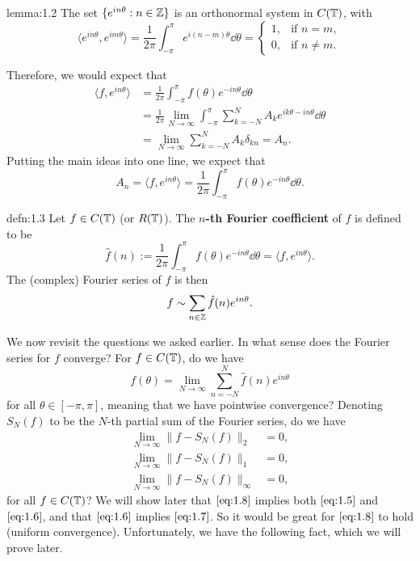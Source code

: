 \begin{lemma}{lemma:1.2}
    The set $\{e^{in\theta} : n \in \mathbb{Z}\}$ is an orthonormal system in 
    $C(\mathbb{T})$, with 
    \[ \langle e^{in\theta}, e^{im\theta} \rangle = \frac{1}{2\pi} 
    \int_{-\pi}^\pi e^{i(n-m)\theta}\dd\theta = \begin{cases} 
        1, & \text{if } n=m, \\ 
        0, & \text{if } n\neq m.
    \end{cases} \] 
\end{lemma}

Therefore, we would expect that 
\begin{align*}
    \langle f, e^{in\theta} \rangle 
    &= \frac{1}{2\pi} \int_{-\pi}^\pi f(\theta)e^{-in\theta}\dd\theta \\ 
    &= \frac{1}{2\pi} \lim_{N\to\infty} \int_{-\pi}^\pi \sum_{k=-N}^N
    A_k e^{ik\theta - in\theta}\dd\theta \\ 
    &= \lim_{N\to\infty} \sum_{k=-N}^N A_k \delta_{kn} = A_n. 
\end{align*}
Putting the main ideas into one line, we expect that 
\[ A_n = \langle f, e^{in\theta} \rangle = \frac{1}{2\pi} \int_{-\pi}^\pi 
f(\theta)e^{-in\theta}\dd\theta. \] 

\begin{defn}{defn:1.3}
    Let $f \in C(\mathbb{T})$ (or $R(\mathbb{T})$). The {\bf $n$-th Fourier coefficient} of 
    $f$ is defined to be 
    \[ \hat f(n) := \frac{1}{2\pi} \int_{-\pi}^\pi f(\theta)e^{-in\theta}\dd\theta = 
    \langle f, e^{in\theta} \rangle. \] 
    The (complex) Fourier series of $f$ is then 
    \[ f \sim \sum_{n\in\mathbb{Z}} \hat f(n)e^{in\theta}. \] 
\end{defn}

We now revisit the questions we asked earlier. In what sense does the 
Fourier series for $f$ converge? For $f \in C(\mathbb{T})$, do we have 
\begin{equation}\label{eq:1.5}
    f(\theta) = \lim_{N\to\infty} \sum_{n=-N}^N \hat f(n)e^{in\theta} \tag{A}
\end{equation}
for all $\theta \in [-\pi, \pi]$, meaning that we have pointwise convergence? 
Denoting $S_N(f)$ to be the $N$-th partial sum of the Fourier series, do we have 
\begin{align}
    \lim_{N\to\infty} \|f - S_N(f)\|_2 &= 0, \label{eq:1.6} \tag{B} \\ 
    \lim_{N\to\infty} \|f - S_N(f)\|_1 &= 0, \label{eq:1.7} \tag{C} \\ 
    \lim_{N\to\infty} \|f - S_N(f)\|_\infty &= 0, \label{eq:1.8} \tag{D}
\end{align}
for all $f \in C(\mathbb{T})$? We will show later that $\eqref{eq:1.8}$ implies both 
$\eqref{eq:1.5}$ and $\eqref{eq:1.6}$, and that $\eqref{eq:1.6}$ implies 
$\eqref{eq:1.7}$. So it would be great for $\eqref{eq:1.8}$ to hold 
(uniform convergence). Unfortunately, we have the following fact, which 
we will prove later. 

